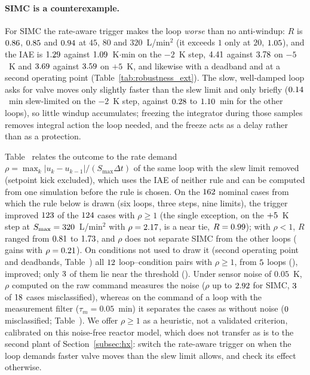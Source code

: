 \paragraph{SIMC is a counterexample.} For SIMC the rate-aware trigger makes the loop \emph{worse} than no anti-windup: $R$ is $0.86$, $0.85$ and $0.94$ at $45$, $80$ and $320$~L/min$^2$ (it exceeds $1$ only at $20$, $1.05$), and the IAE is $1.29$ against $1.09$~K$\cdot$min on the $-2$~K step, $4.41$ against $3.78$ on $-5$~K and $3.69$ against $3.59$ on $+5$~K, and likewise with a deadband and at a second operating point (Table~\ref{tab:robustness_ext}). The slow, well-damped loop asks for valve moves only slightly faster than the slew limit and only briefly ($0.14$~min slew-limited on the $-2$~K step, against $0.28$ to $1.10$~min for the other loops), so little windup accumulates; freezing the integrator during those samples removes integral action the loop needed, and the freeze acts as a delay rather than as a protection.

Table~ relates the outcome to the rate demand $\rho = \max_k|u_k - u_{k-1}|/(S_{\max}\Delta t)$ of the same loop with the slew limit removed (setpoint kick excluded), which uses the IAE of neither rule and can be computed from one simulation before the rule is chosen. On the $162$ nominal cases from which the rule below is drawn (six loops, three steps, nine limits), the trigger improved $123$ of the $124$ cases with $\rho \ge 1$ (the single exception, \vrhoexcloop{} on the $+5$~K step at $S_{\max} = 320$~L/min$^2$ with $\rho = 2.17$, is a near tie, $R = 0.99$); with $\rho < 1$, $R$ ranged from $0.81$ to $1.73$, and $\rho$ does not separate SIMC from the other loops (\vrhohelplowloop{} gains with $\rho = 0.21$). On conditions not used to draw it (second operating point and deadbands, Table~) all $12$ loop--condition pairs with $\rho \ge 1$, from $5$ loops (\vchkhilooplist{}), improved; only $3$ of them lie near the threshold (\vchknearlist{}). Under sensor noise of $0.05$~K, $\rho$ computed on the raw command measures the noise ($\rho$ up to $2.92$ for SIMC, $3$ of $18$ cases misclassified), whereas on the command of a loop with the measurement filter ($\tau_m = 0.05$~min) it separates the cases as without noise ($0$ misclassified; Table~). We offer $\rho \ge 1$ as a heuristic, not a validated criterion, calibrated on this noise-free reactor model, which does not transfer as is to the second plant of Section~\ref{subsec:hx}: switch the rate-aware trigger on when the loop demands faster valve moves than the slew limit allows, and check its effect otherwise.

